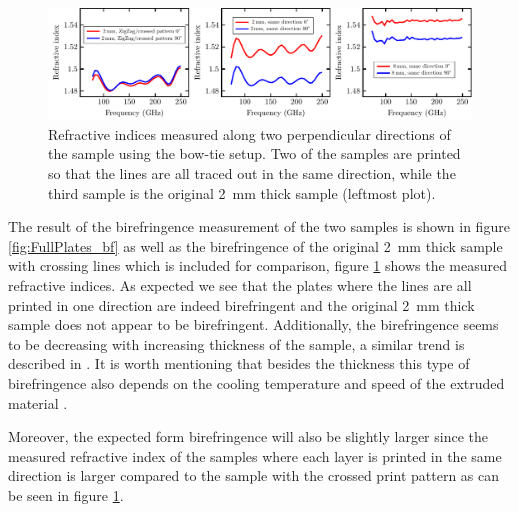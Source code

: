 \begin{figure}[H]
    \centering
    \includegraphics[scale=.68]{images/results/plots/polymer/IntrinsicBF/ri_fullplates.pdf}
    \caption{Refractive indices measured along two perpendicular directions of the sample using the bow-tie setup. Two of the samples are printed so that the lines are all traced out in the same direction, while the third sample is the original \SI{2}{\milli \meter} thick sample (leftmost plot).}
    \label{fig:ri_fullplates}
\end{figure}

The result of the birefringence measurement of the two samples is shown in figure \ref{fig:FullPlates_bf} as well as the birefringence of the original \SI{2}{\milli \meter} thick sample with crossing lines which is included for comparison, figure \ref{fig:ri_fullplates} shows the measured refractive indices. As expected we see that the plates where the lines are all printed in one direction are indeed birefringent and the original \SI{2}{\milli \meter} thick sample does not appear to be birefringent. Additionally, the birefringence seems to be decreasing with increasing thickness of the sample, a similar trend is described in \cite{Solr-urn:nbn:de:hebis:04-z2017-0786}. It is worth mentioning that besides the thickness this type of birefringence also depends on the cooling temperature and speed of the extruded material \cite{Solr-urn:nbn:de:hebis:04-z2017-0786}.

Moreover, the expected form birefringence will also be slightly larger since the measured refractive index of the samples where each layer is printed in the same direction is larger compared to the sample with the crossed print pattern as can be seen in figure \ref{fig:ri_fullplates}. 

